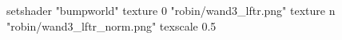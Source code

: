setshader "bumpworld"
   texture 0 "robin/wand3_lftr.png"
   texture n "robin/wand3_lftr_norm.png"
texscale 0.5